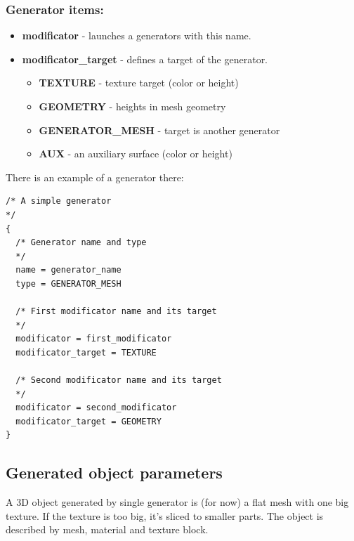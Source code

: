\documentclass[9pt]{article}
\begin{document}
\subsubsection*{Generator items:}
\begin{itemize}
\item{\bf modificator} - launches a generators with this name.
\item{\bf modificator\_target} - defines a target of the generator.
\begin{itemize}
\item{\bf TEXTURE} - texture target (color or height)
\item{\bf GEOMETRY} - heights in mesh geometry
\item{\bf GENERATOR\_MESH} - target is another generator
\item{\bf AUX} - an auxiliary surface (color or height)
\end{itemize}
\end{itemize}
There is an example of a generator there:
\begin{verbatim}
/* A simple generator
*/
{
  /* Generator name and type
  */
  name = generator_name
  type = GENERATOR_MESH
  
  /* First modificator name and its target
  */
  modificator = first_modificator
  modificator_target = TEXTURE
  
  /* Second modificator name and its target
  */
  modificator = second_modificator
  modificator_target = GEOMETRY
}
\end{verbatim}

\subsection{Generated object parameters}
A 3D object generated by single generator is (for now) a flat mesh with
one big texture. If the texture is too big, it's sliced to smaller parts.
The object is described by mesh, material and texture block.
\end{document}
